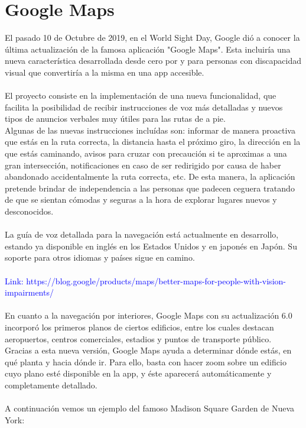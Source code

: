 \documentclass{article}
\begin{document}
	\section{Google Maps}
		El pasado 10 de Octubre de 2019, en el World Sight Day, Google dió a conocer la última actualización de la famosa aplicación "Google Maps". Esta incluiría una nueva característica desarrollada desde cero por y para personas con discapacidad visual que convertiría a la misma en una app accesible.
		\\
		\\
		El proyecto consiste en la implementación de una nueva funcionalidad, que facilita la posibilidad de recibir instrucciones de voz más detalladas y nuevos tipos de anuncios verbales muy útiles para las rutas de a pie.
		\\
		Algunas de las nuevas instrucciones incluídas son: informar de manera proactiva que estás en la ruta correcta, la distancia hasta el próximo giro, la dirección en la que estás caminando, avisos para cruzar con precaución si te aproximas a una gran intersección, notificaciones en caso de ser redirigido por causa de haber abandonado accidentalmente la ruta correcta, etc. De esta manera, la aplicación pretende brindar de independencia a las personas que padecen ceguera tratando de que se sientan cómodas y seguras a la hora de explorar lugares nuevos y desconocidos.
		\\
		\\
		La guía de voz detallada para la navegación está actualmente en desarrollo, estando ya disponible en inglés en los Estados Unidos y en japonés en Japón. Su soporte para otros idiomas y países sigue en camino.
		\\
		\\
		\textcolor{blue}{Link: https://blog.google/products/maps/better-maps-for-people-with-vision-impairments/}
		\\
		\\
        En cuanto a la navegación por interiores, Google Maps con su actualización 6.0 incorporó los primeros planos de ciertos edificios, entre los cuales destacan aeropuertos, centros comerciales, estadios y puntos de transporte público.
		\\
		Gracias a esta nueva versión, Google Maps ayuda a determinar dónde estás, en qué planta y hacia dónde ir. Para ello, basta con hacer zoom sobre un edificio cuyo plano esté disponible en la app, y éste aparecerá automáticamente y completamente detallado.
		\\
		\\
		A continuación vemos un ejemplo del famoso Madison Square Garden de Nueva York: 
		
\end{document}
